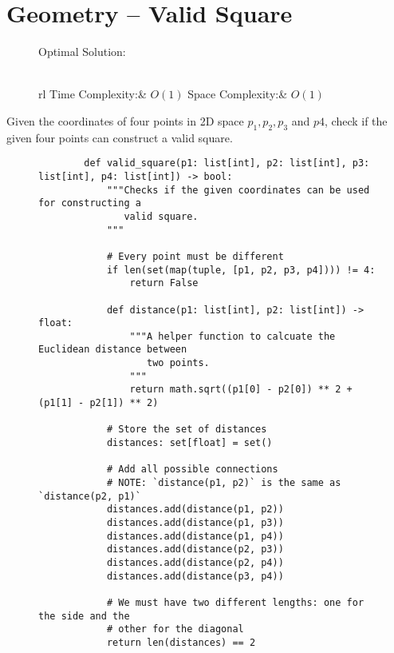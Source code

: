
\section{Geometry -- Valid Square}

\begin{figure}[H]
    Optimal Solution:\\\\
    \begin{tabular}{rl}
        Time Complexity:& \(O(1)\)
        Space Complexity:& \(O(1)\)
    \end{tabular}
\end{figure}

Given the coordinates of four points in 2D space \(p_1, p_2, p_3\) and \(p4\),
check if the given four points can construct a valid square.

\begin{figure}[H]
    \centering
    \begin{verbatim}
        def valid_square(p1: list[int], p2: list[int], p3: list[int], p4: list[int]) -> bool:
            """Checks if the given coordinates can be used for constructing a
               valid square.
            """

            # Every point must be different
            if len(set(map(tuple, [p1, p2, p3, p4]))) != 4:
                return False

            def distance(p1: list[int], p2: list[int]) -> float:
                """A helper function to calcuate the Euclidean distance between
                   two points.
                """
                return math.sqrt((p1[0] - p2[0]) ** 2 + (p1[1] - p2[1]) ** 2)

            # Store the set of distances
            distances: set[float] = set()

            # Add all possible connections
            # NOTE: `distance(p1, p2)` is the same as `distance(p2, p1)`
            distances.add(distance(p1, p2))
            distances.add(distance(p1, p3))
            distances.add(distance(p1, p4))
            distances.add(distance(p2, p3))
            distances.add(distance(p2, p4))
            distances.add(distance(p3, p4))

            # We must have two different lengths: one for the side and the
            # other for the diagonal
            return len(distances) == 2
    \end{verbatim}
\end{figure}
